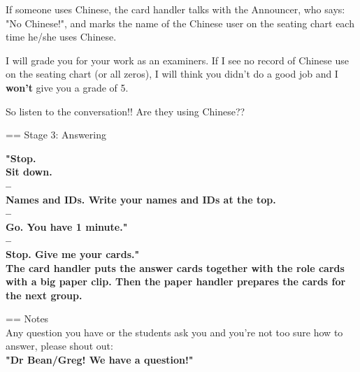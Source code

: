 \documentclass[a4paper]{article}
\begin{document}
\begin{textblock}{14}
\begin{description}
%

If someone uses Chinese, the card handler
talks with the Announcer, who says: "No Chinese!", and marks
the name of the Chinese user on the seating chart each time he/she uses Chinese.

I will grade you for your work as an examiners. If I see no record of Chinese use on the seating chart (or all zeros), I will think you didn't do a good job and I \textbf{won't} give you a grade of 5.

So listen to the conversation!! Are they using Chinese??

\end{description}

\Huge == Stage 3: Answering\\

\begin{description}

\large \mdseries
\item [Announcer]
\Large \bfseries
	"Stop.\\
	Sit down.\\
	--\\
	Names and IDs. Write your names and IDs at the top.\\
	--\\
	Go. You have 1 minute."\\
	--\\
	Stop. Give me your cards."\\

\large \mdseries
The card handler puts the answer cards together with the role cards with a big paper clip. Then the paper handler prepares the cards for the next group.

\end{description}

\Huge == Notes\\

\large \mdseries
Any question you have or the students ask you and you're not too sure how to answer, please shout out:\\
\Huge \bfseries
	"Dr Bean/Greg! We have a question!"

\end{textblock}

\end{document}
